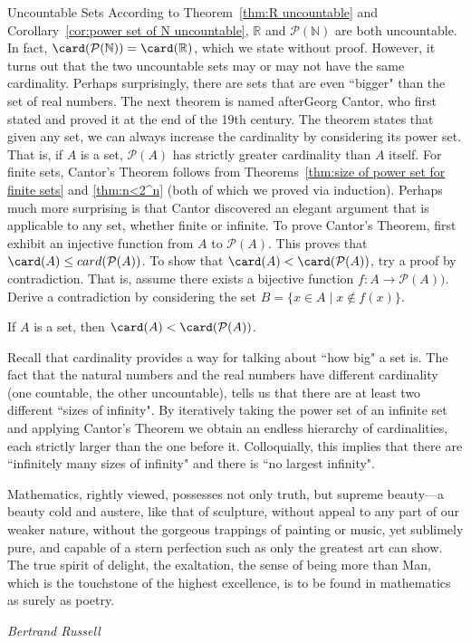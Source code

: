 \begin{section}{Uncountable Sets}
According to Theorem~\ref{thm:R uncountable} and Corollary~\ref{cor:power set of N uncountable}, $\mathbb{R}$ and $\mathcal{P}(\mathbb{N})$ are both uncountable. In fact, $\card(\mathcal{P}(\mathbb{N}))=\card(\mathbb{R})$, which we state without proof.  However, it turns out that the two uncountable sets may or may not have the same cardinality.  Perhaps surprisingly, there are sets that are even ``bigger" than the set of real numbers. The next theorem is named afterGeorg Cantor, who first stated and proved it at the end of the 19th century. The theorem states that given any set, we can always increase the cardinality by considering its power set. That is, if $A$ is a set, $\mathcal{P}(A)$ has strictly greater cardinality than $A$ itself. For finite sets, Cantor's Theorem follows from Theorems~\ref{thm:size of power set for finite sets} and \ref{thm:n<2^n} (both of which we proved via induction). Perhaps much more surprising is that Cantor discovered an elegant argument that is applicable to any set, whether finite or infinite. To prove Cantor's Theorem, first exhibit an injective function from $A$ to $\mathcal{P}(A)$. This proves that $\card(A)\leq card(\mathcal{P}(A))$. To show that $\card(A)< \card(\mathcal{P}(A))$, try a proof by contradiction. That is, assume there exists a bijective function $f:A\to\mathcal{P}(A))$. Derive a contradiction by considering the set $B=\{x\in A\mid x\notin f(x)\}$.

\begin{theorem}\label{thm:Cantors Theorem}
If $A$ is a set, then $\card(A)<\card(\mathcal{P}(A))$.
\end{theorem}

Recall that cardinality provides a way for talking about ``how big" a set is. The fact that the natural numbers and the real numbers have different cardinality (one countable, the other uncountable), tells us that there are at least two different ``sizes of infinity".  By iteratively taking the power set of an infinite set and applying Cantor's Theorem we obtain an endless hierarchy of cardinalities, each strictly larger than the one before it. Colloquially, this implies that there are ``infinitely many sizes of infinity" and there is ``no largest infinity".

\epigraph{Mathematics, rightly viewed, possesses not only truth, but supreme beauty---a beauty cold and austere, like that of sculpture, without appeal to any part of our weaker nature, without the gorgeous trappings of painting or music, yet sublimely pure, and capable of a stern perfection such as only the greatest art can show. The true spirit of delight, the exaltation, the sense of being more than Man, which is the touchstone of the highest excellence, is to be found in mathematics as surely as poetry.}{\emph{Bertrand Russell}}

\end{section}